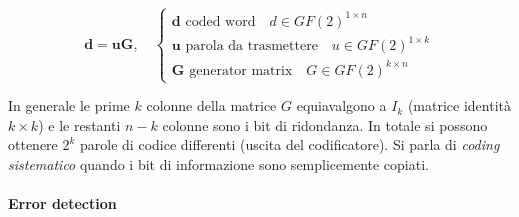 \[
    \mathbf{d} = \mathbf{uG}, \quad \begin{cases}
        \mathbf{d} \text{ coded word} \quad d \in GF(2)^{1 \times n} \\
        \mathbf{u} \text{ parola da trasmettere} \quad u \in GF(2)^{1 \times k} \\
        \mathbf{G} \text{ generator matrix} \quad G \in GF(2)^{k \times n}
    \end{cases}
\]

In generale le prime $k$ colonne della matrice $G$ equiavalgono a $I_k$ (matrice identità $k \times k$) e le restanti $n-k$ colonne sono i bit di ridondanza.
In totale si possono ottenere $2^k$ parole di codice differenti (uscita del codificatore).
Si parla di \textit{coding sistematico} quando i bit di informazione sono semplicemente copiati.

\paragraph*{Error detection}

